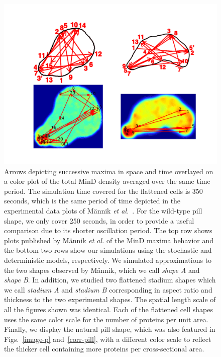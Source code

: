 \documentclass[10pt,letterpaper]{article}
\begin{document}
\begin{figure}
  \centering
  \hspace{-3cm}
  \vspace{1cm}
  \includegraphics[width=16cm]{../paper/plot-ave}
  \caption{Arrows depicting successive maxima in space
    and time overlayed on a color plot of the total MinD density
    averaged over the same time period.  The simulation time covered
    for the flattened cells is 350 seconds, which is the same
    period of time depicted in the experimental data plots of M\"annik
    \emph{et al.}~\cite{mannik2012robustness}.  For the wild-type pill
    shape, we only cover 250 seconds, in order to provide a
    useful comparison due to its shorter oscillation period.  The top
    row shows plots published by M\"annik \emph{et al.} of the MinD maxima behavior
    and the bottom two rows show our simulations using the stochastic
    and deterministic models, respectively.  We simulated
    approximations to the two shapes observed by M\"annik, which we call
    \emph{shape A} and \emph{shape B}.  In addition, we studied two
    flattened stadium shapes which we call \emph{stadium A} and
    \emph{stadium B} corresponding in aspect ratio and thickness to
    the two experimental shapes.  The spatial length scale of all the
    figures shown was identical. Each of the flattened cell shapes
    uses the same color scale for the number of proteins per unit
    area.  Finally, we display the natural pill shape, which was also
    featured in Figs.~\ref{image-p} and~\ref{corr-pill}, with a
    different color scale to reflect the thicker cell containing more
    proteins per cross-sectional area.  }
  \label{randst-plot-ave}
\end{figure}
\end{document}
